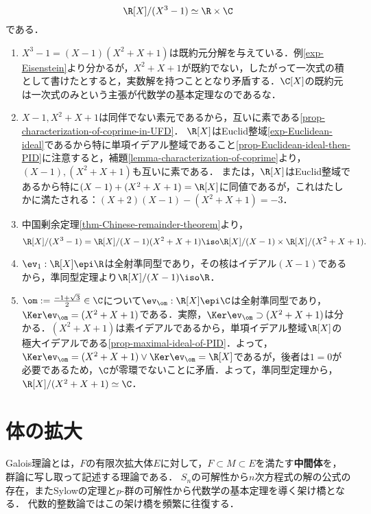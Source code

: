 \documentclass[uplatex,dvipdfmx]{jsreport}
\begin{document}
\begin{example}[多項式の生成するイデアルによる剰余環の構造決定]
    \[\R[X]/(X^3-1)\simeq\R\times\C\]
    である．
    \begin{enumerate}
        \item $X^3-1=(X-1)(X^2+X+1)$は既約元分解を与えている．例\ref{exp-Eisenstein}より分かるが，$X^2+X+1$が既約でない，したがって一次式の積として書けたとすると，実数解を持つこととなり矛盾する．$\C[X]$の既約元は一次式のみという主張が代数学の基本定理なのであるな．
        \item $X-1,X^2+X+1$は同伴でない素元であるから，互いに素である\ref{prop-characterization-of-coprime-in-UFD}．
        $\R[X]$はEuclid整域\ref{exp-Euclidean-ideal}であるから特に単項イデアル整域であること\ref{prop-Euclidean-ideal-then-PID}に注意すると，補題\ref{lemma-characterization-of-coprime}より，$(X-1),(X^2+X+1)$も互いに素である．
        または，$\R[X]$はEuclid整域であるから特に$(X-1)+(X^2+X+1)=\R[X]$に同値であるが，これはたしかに満たされる：$(X+2)(X-1)-(X^2+X+1)=-3$．
        \item 中国剰余定理\ref{thm-Chinese-remainder-theorem}より，\[\R[X]/(X^3-1)=\R[X]/(X-1)(X^2+X+1)\iso\R[X]/(X-1)\times\R[X]/(X^2+X+1).\]
        \item $\ev_1:\R[X]\epi\R$は全射準同型であり，その核はイデアル$(X-1)$であるから，準同型定理より$\R[X]/(X-1)\iso\R$．
        \item $\om:=\frac{-1+\sqrt{3}}{2}\in\C$について$\ev_\om:\R[X]\epi\C$は全射準同型であり，$\Ker\ev_\om=(X^2+X+1)$である．実際，$\Ker\ev_\om\supset(X^2+X+1)$は分かる．$(X^2+X+1)$は素イデアルであるから，単項イデアル整域$\R[X]$の極大イデアルである\ref{prop-maximal-ideal-of-PID}．よって，$\Ker\ev_\om=(X^2+X+1)\lor\Ker\ev_\om=\R[X]$であるが，後者は$1=0$が必要であるため，$\C$が零環でないことに矛盾．よって，準同型定理から，$\R[X]/(X^2+X+1)\simeq\C$．
    \end{enumerate}
\end{example}

\section{体の拡大}

\begin{tcolorbox}[colframe=ForestGreen, colback=ForestGreen!10!white,breakable,colbacktitle=ForestGreen!40!white,coltitle=black,fonttitle=\bfseries\sffamily,
title=体の消息を群論で調べる]
    Galois理論とは，$F$の有限次拡大体$E$に対して，$F\subset M\subset E$を満たす\textbf{中間体}を，群論に写し取って記述する理論である．
    $S_n$の可解性から$n$次方程式の解の公式の存在，またSylowの定理と$p$-群の可解性から代数学の基本定理を導く架け橋となる．
    代数的整数論ではこの架け橋を頻繁に往復する．
\end{tcolorbox}
\end{document}
